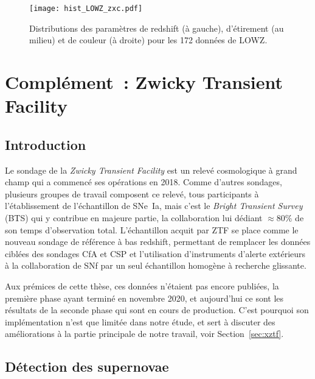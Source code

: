 \documentclass[../main/main.tex]{subfiles}
\begin{document}
\begin{figure}[ht]
    \centering
    \texttt{[image: hist\_LOWZ\_zxc.pdf]}
    \caption[Distributions des paramètres de redshift, étirement et couleur de
    LOWZ]{Distributions des paramètres de redshift (à gauche), d'étirement (au
    milieu) et de couleur (à droite) pour les 172 données de LOWZ.}
    \label{fig:lowzhist}
\end{figure}

\section{Complément~: Zwicky Transient Facility}\label{sec:ztf}
\subsection{Introduction}\label{ssec:ztfintro}

Le sondage de la \textit{Zwicky Transient Facility} \citep[ZTF,][]{bellm2019,
dekany2020} est un relevé cosmologique à grand champ qui a commencé ses
opérations en 2018. Comme d'autres sondages, plusieurs groupes de travail
composent ce relevé, tous participants à l'établissement de l'échantillon de
SNe~Ia, mais c'est le \textit{Bright Transient Survey} (BTS) qui y contribue en
majeure partie, la collaboration lui dédiant $\approx 80\%$ de son temps
d'observation total. L'échantillon acquit par ZTF se place comme le nouveau
sondage de référence à bas redshift, permettant de remplacer les données ciblées
des sondages CfA et CSP et l'utilisation d'instruments d'alerte extérieurs à la
collaboration de SNf par un seul échantillon homogène à recherche glissante.

Aux prémices de cette thèse, ces données n'étaient pas encore publiées, la
première phase ayant terminé en novembre 2020, et aujourd'hui ce sont les
résultats de la seconde phase qui sont en cours de production. C'est pourquoi
son implémentation n'est que limitée dans notre étude, et sert à discuter des
améliorations à la partie principale de notre travail, voir
Section~\ref{sec:xztf}.

\subsection{Détection des supernovae}\label{ssec:ztfdetec}
\end{document}

